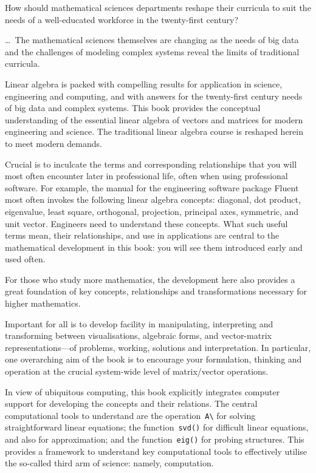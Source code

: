 \begin{quoted}{\cite{Bressoud2014}}
How should mathematical sciences departments reshape their curricula to suit the needs of a well-educated workforce in the twenty-first century?

\ldots\
The mathematical sciences themselves are changing as the needs of big data and the challenges of modeling complex systems reveal the limits of traditional curricula.
%
\end{quoted}



Linear algebra is packed with compelling results for application in science, engineering and computing, and with answers for the twenty-first century needs of big data and complex systems.
This book provides the conceptual understanding of the essential linear algebra of vectors and matrices for modern engineering and science.
The traditional linear algebra course is reshaped herein to meet modern demands.

Crucial is to inculcate the terms and corresponding relationships that you will most often encounter later in professional life, often when using professional software.  
For example, the manual for the engineering software package Fluent most often invokes the following linear algebra concepts: diagonal, dot product, eigenvalue, least square, orthogonal, projection, principal axes, symmetric, and unit vector.
Engineers need to understand these concepts.
What such useful terms mean, their relationships, and use in applications are central to the mathematical development in this book: you will see them introduced early and used often.

For those who study more mathematics, the development here also provides a great foundation of key concepts, relationships and transformations necessary for higher mathematics. 

Important for all is to develop facility in manipulating, interpreting and transforming between visualisations, algebraic forms, and vector-matrix representations---of problems, working, solutions and interpretation.
In particular, one overarching aim of the book is to encourage your formulation, thinking and operation at the crucial system-wide level of matrix\slash vector operations.

In view of ubiquitous computing, this book explicitly integrates computer support for developing the concepts and their relations.
The central computational tools to understand are the operation~\verb|A\| for solving straightforward linear equations; the function~\verb|svd()| for difficult linear equations, and also for approximation; and the function~\verb|eig()| for probing structures.
This provides a framework to understand key computational tools to effectively utilise the so-called third arm of science: namely, computation. 

